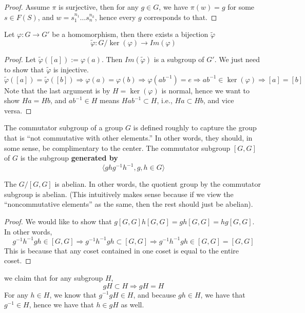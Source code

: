 \begin{proof}
    Assume $\pi$ is surjective, then for any $g\in G$, we have $\pi(w)=g$ for some $s\in F(S)$, and $w=s_1^{n_1}\ldots s_n^{n_k}$, hence every $g$ corresponds to that.
\end{proof}
\begin{thm}
    Let $\varphi: G\to G'$ be a homomorphism, then there exists a bijection $\tilde{\varphi}$
    \begin{equation*}
        \tilde{\varphi}: G/\ker(\varphi)\to Im(\varphi)
    \end{equation*}
\end{thm}
\begin{proof}
    Let $\tilde{\varphi}([a]):=\varphi(a)$. Then $Im(\tilde{\varphi})$ is a subgroup of $G'$. We just need to show that $\tilde{\varphi}$ is injective. 
    \begin{equation*}
        \tilde{\varphi}([a])=\tilde{\varphi}([b])\Rightarrow \varphi(a)=\varphi(b)\Rightarrow \varphi(ab^{-1})=e\Rightarrow ab^{-1}\in\ker(\varphi)\Rightarrow [a]=[b]
    \end{equation*}
    Note that the last argument is by $H=\ker(\varphi)$ is normal, hence we want to show $Ha=Hb$, and $ab^{-1}\in H$ means $Hab^{-1}\subset H$, i.e., $Ha\subset Hb$, and vice versa.
\end{proof}
\begin{example}
    The commutator subgroup of a group $G$ is defined roughly to capture the group that is ``not commutative with other elements.'' In other words, they should, in some sense, be complimentary to the center. The commutator subgroup $[G,G]$ of $G$ is the subgroup \textbf{generated by}
    \begin{equation*}
        \langle ghg^{-1}h^{-1}, g,h\in G\rangle 
    \end{equation*}
    \begin{prop}
        The $G/[G,G]$ is abelian. In other words, the quotient group by the commutator subgroup is abelian. (This intuitively makes sense because if we view the ``noncommutative elements'' as the same, then the rest should just be abelian).
    \end{prop}
    \begin{proof}
        We would like to show that $g[G,G]h[G,G]=gh[G,G]=hg[G,G]$. In other words,
        \begin{equation*}
            g^{-1}h^{-1}gh\in [G,G]\Rightarrow g^{-1}h^{-1}gh\subset [G,G]\Rightarrow g^{-1}h^{-1}gh\in [G,G]=[G,G]
        \end{equation*}
        This is because that any coset contained in one coset is equal to the entire coset.
    \end{proof}
    \begin{lem}
        we claim that for any subgroup $H$,
        \begin{equation*}
            gH\subset H\Rightarrow gH=H
        \end{equation*}
        For any $h\in H$, we know that $g^{-1}gH\in H$, and because $gh\in H$, we have that $g^{-1}\in H$, hence we have that $h\in gH$ as well.
    \end{lem}
\end{example}
